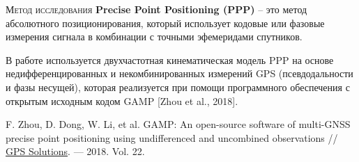 \begin{frame}{\textsc{Метод исследования}}
\textbf{Precise Point Positioning (PPP)} – это метод абсолютного позиционирования, который использует кодовые или фазовые измерения сигнала в комбинации с точными эфемеридами спутников.

\vspace{1em}
В работе используется двухчастотная кинематическая модель PPP на основе недифференцированных и некомбинированных измерений GPS (псевдодальности и фазы несущей), которая реализуется при помощи программного обеспечения с открытым исходным кодом GAMP [Zhou et al., 2018].

\vspace{1em}
F. Zhou, D. Dong, W. Li, et al. GAMP: An open-source software of multi-GNSS precise point positioning using undifferenced and uncombined observations // \href{http://dx.doi.org/10.1007/s10291-018-0699-9}{GPS Solutions}. --- 2018. Vol. 22. 
\end{frame}

